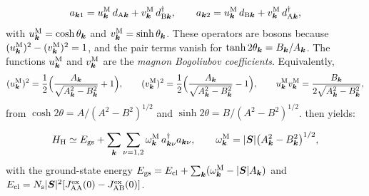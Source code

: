 \begin{equation}
  a_{\bm{k}1} = u^{\mathrm{M}}_{\bm{k}}\,d_{\mathrm{A}\bm{k}} + v^{\mathrm{M}}_{\bm{k}}\,d^\dagger_{\mathrm{B}\bm{k}}, \qquad
  a_{\bm{k}2} = u^{\mathrm{M}}_{\bm{k}}\,d_{\mathrm{B}\bm{k}} + v^{\mathrm{M}}_{\bm{k}}\,d^\dagger_{\mathrm{A}\bm{k}} ,
  \label{eq:7.1-bogo}
\end{equation}
with $u^{\mathrm{M}}_{\bm{k}} = \cosh\theta_{\bm{k}}$ and $v^{\mathrm{M}}_{\bm{k}} = \sinh\theta_{\bm{k}}$. These operators are bosons because $(u^{\mathrm{M}}_{\bm{k}})^2 - (v^{\mathrm{M}}_{\bm{k}})^2 = 1$, and the pair terms vanish for $\tanh2\theta_{\bm{k}} = B_{\bm{k}}/A_{\bm{k}}$. The functions $u^{\mathrm{M}}_{\bm{k}}$ and $v^{\mathrm{M}}_{\bm{k}}$ are the \emph{magnon Bogoliubov coefficients}. Equivalently,
\begin{equation*}
  (u^{\mathrm{M}}_{\bm{k}})^2 = \frac12\Bigl(\frac{A_{\bm{k}}}{\sqrt{A_{\bm{k}}^2 - B_{\bm{k}}^2}} + 1\Bigr), \qquad
  (v^{\mathrm{M}}_{\bm{k}})^2 = \frac12\Bigl(\frac{A_{\bm{k}}}{\sqrt{A_{\bm{k}}^2 - B_{\bm{k}}^2}} - 1\Bigr), \qquad
  u^{\mathrm{M}}_{\bm{k}}v^{\mathrm{M}}_{\bm{k}} = \frac{B_{\bm{k}}}{2\sqrt{A_{\bm{k}}^2 - B_{\bm{k}}^2}} ,
\end{equation*}
from $\cosh2\theta = A/(A^2 - B^2)^{1/2}$ and $\sinh2\theta = B/(A^2 - B^2)^{1/2}$.  then yields:
\begin{keyresult}
\begin{equation}
  H_{\mathrm{H}} \simeq E_{\mathrm{gs}} + \sum_{\bm{k}}\sum_{\nu=1,2}\omega^{\mathrm{M}}_{\bm{k}}\,a^\dagger_{\bm{k}\nu}a_{\bm{k}\nu}, \qquad
  \omega^{\mathrm{M}}_{\bm{k}} = |\bm{S}|\bigl(A_{\bm{k}}^2 - B_{\bm{k}}^2\bigr)^{1/2} ,
  \label{eq:7.1-afm}
\end{equation}
with the ground-state energy $E_{\mathrm{gs}} = E_{\mathrm{cl}} + \sum_{\bm{k}}(\omega^{\mathrm{M}}_{\bm{k}} - |\bm{S}|A_{\bm{k}})$ and $E_{\mathrm{cl}} = N_{\mathrm{s}}|\bm{S}|^2[J^{\mathrm{ex}}_{\mathrm{AA}}(0) - J^{\mathrm{ex}}_{\mathrm{AB}}(0)]$.
\end{keyresult}
